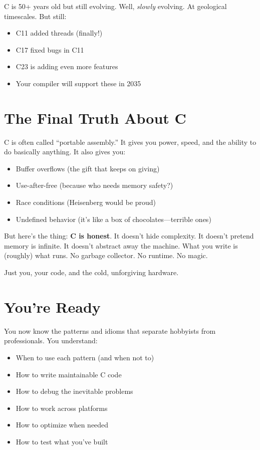 \documentclass[10pt,openany]{book}
\begin{document}
C is 50+ years old but still evolving. Well, \textit{slowly} evolving. At geological timescales. But still:
\begin{itemize}
    \item C11 added threads (finally!)
    \item C17 fixed bugs in C11
    \item C23 is adding even more features
    \item Your compiler will support these in 2035
\end{itemize}

\section*{The Final Truth About C}

C is often called ``portable assembly.'' It gives you power, speed, and the ability to do basically anything. It also gives you:

\begin{itemize}
    \item Buffer overflows (the gift that keeps on giving)
    \item Use-after-free (because who needs memory safety?)
    \item Race conditions (Heisenberg would be proud)
    \item Undefined behavior (it's like a box of chocolates---terrible ones)
\end{itemize}

But here's the thing: \textbf{C is honest}. It doesn't hide complexity. It doesn't pretend memory is infinite. It doesn't abstract away the machine. What you write is (roughly) what runs. No garbage collector. No runtime. No magic.

Just you, your code, and the cold, unforgiving hardware.

\section*{You're Ready}

You now know the patterns and idioms that separate hobbyists from professionals. You understand:

\begin{itemize}
    \item When to use each pattern (and when not to)
    \item How to write maintainable C code
    \item How to debug the inevitable problems
    \item How to work across platforms
    \item How to optimize when needed
    \item How to test what you've built
\end{itemize}
\end{document}
